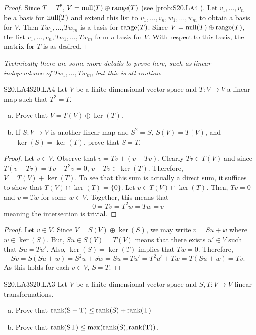\documentclass[../AlgebraQualSolutions.tex]{subfiles}
\begin{document}
	\begin{proof}
		Since $T = T^2$, $V = \mathrm{null}(T) \oplus \mathrm{range}(T)$ (see \ref{prob:S20.LA4}). Let $v_1,\ldots, v_n$ be a basis for $\mathrm{null}(T)$ and extend this list to $v_1,\ldots, v_n, w_1,\ldots,w_m$ to obtain a basis for $V$. Then $Tw_1,\ldots, Tw_m$ is a basis for $\mathrm{range}(T)$. Since $V = \mathrm{null}(T) \oplus \mathrm{range}(T)$, the list $v_1,\ldots, v_n, Tw_1,\ldots, Tw_m$ form a basis for $V$. With respect to this basis, the matrix for $T$ is as desired.
	\end{proof}

	\emph{Technically there are some more details to prove here, such as linear independence of $Tw_1,\ldots, Tw_m$, but this is all routine.}

	\begin{prob}{S20.LA4}{S20.LA4}
		Let $V$ be a finite dimensional vector space and $T: V \to V$ a linear map such that $T^2 = T$.
		\begin{enumerate}[(a)]
			\item Prove that $V = T(V) \oplus \ker(T)$.
			\item If $S: V \to V$ is another linear map and $S^2 = S$, $S(V) = T(V)$, and $\ker(S) = \ker(T)$, prove that $S = T$.
		\end{enumerate}
	\end{prob}

	\begin{proof}
		Let $v \in V$. Observe that $v = Tv + (v - Tv)$. Clearly $Tv \in T(V)$ and since $T(v - Tv) = Tv - T^2v = 0$, $v - Tv \in \ker(T)$. Therefore, $V = T(V) + \ker(T)$. To see that this sum is actually a direct sum, it suffices to show that $T(V) \cap \ker(T) = \{0\}$. Let $v \in T(V) \cap \ker(T)$. Then, $Tv = 0$ and $v = Tw$ for some $w \in V$. Together, this means that
			\[0 = Tv = T^2w = Tw = v\]
		meaning the intersection is trivial.
	\end{proof}

	\begin{proof}
		Let $v \in V$. Since $V = S(V) \oplus \ker(S)$, we may write $v = Su + w$ where $w \in \ker(S)$. But, $Su \in S(V) = T(V)$ means that there exists $u' \in V$ such that $Su = Tu'$. Also, $\ker(S) = \ker(T)$ implies that $Tw = 0$. Therefore,
			\[Sv = S(Su + w) = S^2u + Sw = Su = Tu' = T^2u' + Tw = T(Su + w) = Tv.\]
		As this holds for each $v \in V$, $S = T$.
	\end{proof}

	\begin{prob}{S20.LA3}{S20.LA3}
		Let $V$ be a finite-dimensional vector space and $S,T: V \to V$ linear transformations.
		\begin{enumerate}[(a)]
			\item Prove that $\rm{rank}(S+T) \leq \rm{rank}(S) + \rm{rank}(T)$
			\item Prove that $\rm{rank}(ST) \leq \max(\rm{rank}(S), \rm{rank}(T))$.
		\end{enumerate}
	\end{prob}
\end{document}
